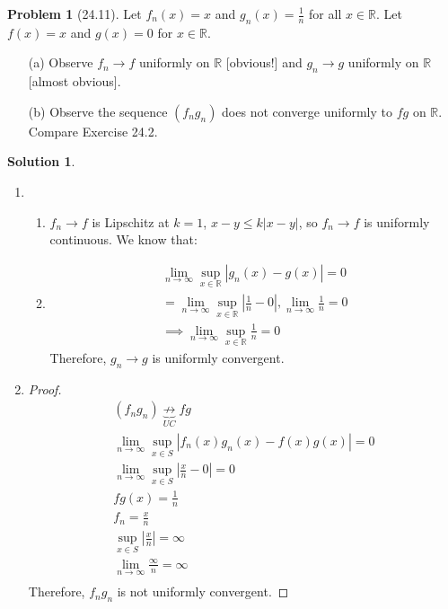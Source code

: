 \documentclass[12pt]{article}
\theoremstyle{definition} %
\newtheorem{solution}{Solution}
\newtheorem{problem}{Problem}
\theoremstyle{plain} %
\begin{document}
\begin{problem}[24.11]
    Let $ f_n(x) = x $ and $ g_n(x) = \frac{1}{n} $ for all $ x \in \mathbb{R} $. Let $ f(x) = x $ and $ g(x) = 0 $ for $ x \in \mathbb{R} $.

\begin{enumerate}
    \item[(a)] Observe $ f_n \to f $ uniformly on $ \mathbb{R} $ [obvious!] and $ g_n \to g $ uniformly on $ \mathbb{R} $ [almost obvious].
    \item[(b)] Observe the sequence $ (f_n g_n) $ does not converge uniformly to $ fg $ on $ \mathbb{R} $. Compare Exercise 24.2.
\end{enumerate}
\end{problem}
\begin{solution}
     \begin{enumerate}
    \item \begin{enumerate}
        \item $f_{n}\to f$ is Lipschitz at $k=1$, $x-y\leq k\left\vert x-y \right\vert $, so $f_{n}\to f$ is uniformly continuous. We know that:
        \item \begin{align}
            \lim_{n \to \infty}\sup_{x\in \mathbb{R}}\left\vert g_{n}(x)-g(x) \right\vert= 0\\[10pt] 
            = \lim_{n \to \infty}\sup_{x\in \mathbb{R}} \left\vert \frac{1}{n}-0 \right\vert, \lim_{n \to \infty} \frac{1}{n}=0 \\[10pt] 
            \implies \lim_{n \to \infty} \sup_{x\in \mathbb{R} } \frac{1}{n}=0
        \end{align}
        Therefore, $g_{n}\to g$ is uniformly convergent. 
        \end{enumerate}
    \item \begin{proof}
        \begin{align}
            (f_{n}g_{n}) \underbrace{\not\to}_{UC} fg \\[10pt] 
            \lim_{n \to \infty} \sup_{x\in S} \left\vert f_{n}(x)g_{n}(x)-f(x)g(x) \right\vert = 0\\[10pt] 
            \lim_{n \to \infty} \sup_{x\in S} \left\vert \frac{x}{n}-0 \right\vert =0 \\[10pt] 
            fg(x) = \frac{1}{n} \\[10pt] 
            f_{n}=\frac{x}{n} \\[10pt] 
            \sup_{x\in S}\left\vert \frac{x}{n} \right\vert = \infty \\[10pt] 
            \lim_{n \to \infty} \frac{\infty}{n} = \infty \\[10pt] 
        \end{align}
        Therefore, $f_{n}g_{n}$ is not uniformly convergent. 
    \end{proof}
     \end{enumerate}
    \end{solution}
\end{document}
